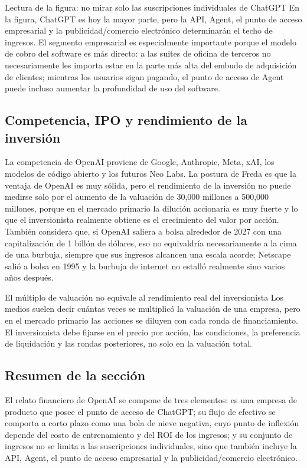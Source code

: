 \begin{knowledgebox}{Lectura de la figura: no mirar solo las suscripciones individuales de ChatGPT}
En la figura, ChatGPT es hoy la mayor parte, pero la API, Agent, el punto de acceso empresarial y la publicidad/comercio electrónico determinarán el techo de ingresos. El segmento empresarial es especialmente importante porque el modelo de cobro del software es más directo: a las suites de oficina de terceros no necesariamente les importa estar en la parte más alta del embudo de adquisición de clientes; mientras los usuarios sigan pagando, el punto de acceso de Agent puede incluso aumentar la profundidad de uso del software.
\end{knowledgebox}

\subsection{Competencia, IPO y rendimiento de la inversión}

La competencia de OpenAI proviene de Google, Anthropic, Meta, xAI, los modelos de código abierto y los futuros Neo Labs. La postura de Freda es que la ventaja de OpenAI es muy sólida, pero el rendimiento de la inversión no puede medirse solo por el aumento de la valuación de 30,000 millones a 500,000 millones, porque en el mercado primario la dilución accionaria es muy fuerte y lo que el inversionista realmente obtiene es el crecimiento del valor por acción. También considera que, si OpenAI saliera a bolsa alrededor de 2027 con una capitalización de 1 billón de dólares, eso no equivaldría necesariamente a la cima de una burbuja, siempre que sus ingresos alcancen una escala acorde; Netscape salió a bolsa en 1995 y la burbuja de internet no estalló realmente sino varios años después.

\begin{warningbox}{El múltiplo de valuación no equivale al rendimiento real del inversionista}
Los medios suelen decir cuántas veces se multiplicó la valuación de una empresa, pero en el mercado primario las acciones se diluyen con cada ronda de financiamiento. El inversionista debe fijarse en el precio por acción, las condiciones, la preferencia de liquidación y las rondas posteriores, no solo en la valuación total.
\end{warningbox}

\subsection{Resumen de la sección}

El relato financiero de OpenAI se compone de tres elementos: es una empresa de producto que posee el punto de acceso de ChatGPT; su flujo de efectivo se comporta a corto plazo como una bola de nieve negativa, cuyo punto de inflexión depende del costo de entrenamiento y del ROI de los ingresos; y su conjunto de ingresos no se limita a las suscripciones individuales, sino que también incluye la API, Agent, el punto de acceso empresarial y la publicidad/comercio electrónico.
